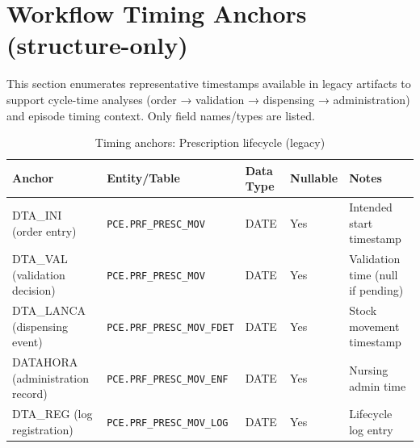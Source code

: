 \section{Workflow Timing Anchors (structure-only)}
This section enumerates representative timestamps available in legacy artifacts to support cycle-time analyses (order → validation → dispensing → administration) and episode timing context. Only field names/types are listed.

\begin{table}[H]
    \centering
    \caption{Timing anchors: Prescription lifecycle (legacy)}
    \label{tab:timing_prescription_lifecycle}
    {\setlength{\tabcolsep}{4pt}\small\renewcommand{\arraystretch}{1.2}
    \begin{tabularx}{\textwidth}{@{}>{\raggedright\arraybackslash}p{3.6cm} >{\raggedright\arraybackslash}p{3.0cm} >{\raggedright\arraybackslash}p{2.2cm} >{\centering\arraybackslash}p{1.7cm} >{\raggedright\arraybackslash}X@{}}
        \toprule
        \textbf{Anchor} & \textbf{Entity/Table} & \textbf{Data Type} & \textbf{Nullable} & \textbf{Notes} \\
        \midrule
        DTA\_INI (order entry) & \texttt{PCE.PRF\_PRESC\_MOV} & DATE & Yes & Intended start timestamp \\
        DTA\_VAL (validation decision) & \texttt{PCE.PRF\_PRESC\_MOV} & DATE & Yes & Validation time (null if pending) \\
        DTA\_LANCA (dispensing event) & \texttt{PCE.PRF\_PRESC\_MOV\_FDET} & DATE & Yes & Stock movement timestamp \\
        DATAHORA (administration record) & \texttt{PCE.PRF\_PRESC\_MOV\_ENF} & DATE & Yes & Nursing admin time \\
        DTA\_REG (log registration) & \texttt{PCE.PRF\_PRESC\_MOV\_LOG} & DATE & Yes & Lifecycle log entry \\
        \bottomrule
    \end{tabularx}}
\end{table}


